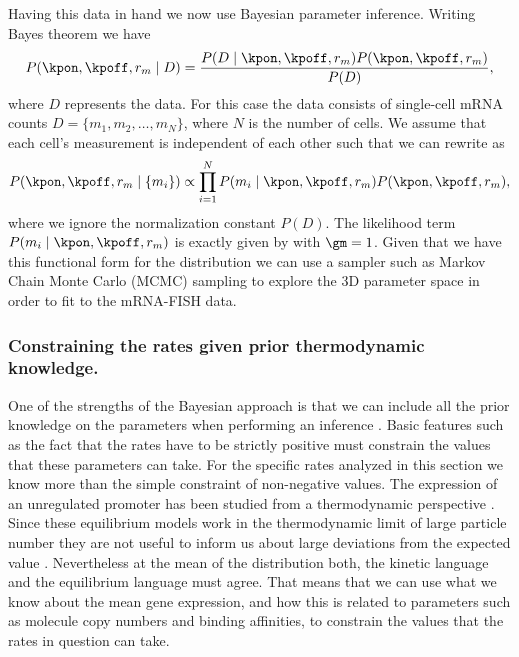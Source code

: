 Having this data in hand we now use Bayesian parameter inference. Writing Bayes
theorem we have
\begin{equation}
  P(\kpon, \kpoff, r_m \mid D) = {P(D \mid \kpon, \kpoff, r_m)
  P(\kpon, \kpoff, r_m) \over P(D)},
  \label{seq_bayes_rnap_rates}
\end{equation}
where $D$ represents the data. For this case the data consists of single-cell
mRNA counts $D = \{ m_1, m_2, \ldots, m_N \}$, where $N$ is the number of cells.
We assume that each cell's measurement is independent of each other such that we
can rewrite  as
\begin{equation}
  P(\kpon, \kpoff, r_m \mid \{m_i\}) \propto
  \prod_{i=1}^N P(m_i \mid \kpon, \kpoff, r_m)
  P(\kpon, \kpoff, r_m),
  \label{seq_bayes_sample}
\end{equation}
where we ignore the normalization constant $P(D)$. The likelihood term $P(m_i
\mid \kpon, \kpoff, r_m)$ is exactly given by  with
$\gm = 1$. Given that we have this functional form for the distribution we can
use a sampler such as Markov Chain Monte Carlo (MCMC) sampling to explore the 3D
parameter space in order to fit  to the mRNA-FISH data.

\subsubsection*{Constraining the rates given prior thermodynamic knowledge.}

One of the strengths of the Bayesian approach is that we can include all the
prior knowledge on the parameters when performing an inference
\cite{MacKay2003}. Basic features such as the fact that the rates have to be
strictly positive must constrain the values that these parameters can take. For
the specific rates analyzed in this section we know more than the simple
constraint of non-negative values. The expression of an unregulated promoter has
been studied from a thermodynamic perspective \cite{Brewster2012}. Since these
equilibrium models work in the thermodynamic limit of large particle number they
are not useful to inform us about large deviations from the expected value
.
Nevertheless at the mean of the distribution both, the kinetic language and the
equilibrium language must agree. That means that we can use what we know about
the mean gene expression, and how this is related to parameters such as molecule
copy numbers and binding affinities, to constrain the values that the rates in
question can take.

